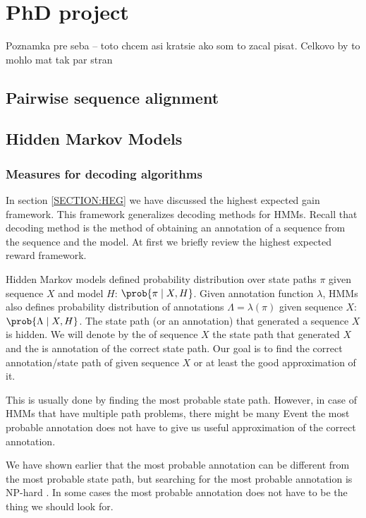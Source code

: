\chapter{PhD project}
Poznamka pre seba -- toto chcem asi kratsie ako som to zacal pisat. Celkovo by
to mohlo mat tak par stran

\section{Pairwise sequence alignment}

\section{Hidden Markov Models}

\subsection{Measures for decoding algorithms}


In section \ref{SECTION:HEG} we have discussed
the highest expected gain framework. This framework generalizes decoding methods
for HMMs. Recall that decoding method is the method of obtaining an annotation
of a sequence from the sequence and the model. At first we briefly review the
highest expected reward framework.

Hidden Markov models defined probability distribution over state paths $\pi$
given sequence $X$ and model $H$: $\prob{\pi\mid X,H}$. Given annotation
function $\lambda$, HMMs also defines probability distribution of annotations
$\Lambda=\lambda(\pi)$ given sequence $X$: $\prob{\Lambda\mid X,H}$.  The state
path (or an annotation) that generated a sequence $X$ is hidden.
We will denote by
the  of sequence $X$ the state path that
generated $X$ and the  is annotation of the
correct state path. Our goal is to find the correct annotation/state path of
given sequence $X$ or at least the good approximation of it.

This is usually done by finding the most probable state path. However,
in case of HMMs that have multiple path problems, there might be many 
Event the most probable annotation does not have to give us useful approximation
of the correct annotation.

We have shown earlier that the most probable annotation can be different from 
the most probable state path, but searching for the most probable annotation is
NP-hard \cite{Lyngso2002,Brejova2007mpa}. In some cases the most probable
annotation does not have to be the thing we should look for.

